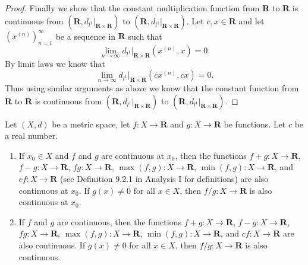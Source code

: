 \begin{proof}
    Finally we show that the constant multiplication function from \(\mathbf{R}\) to \(\mathbf{R}\) is continuous from \((\mathbf{R}, d_{l^1}|_{\mathbf{R} \times \mathbf{R}})\) to \((\mathbf{R}, d_{l^1}|_{\mathbf{R} \times \mathbf{R}})\).
    Let \(c, x \in \mathbf{R}\) and let \((x^{(n)})_{n = 1}^\infty\) be a sequence in \(\mathbf{R}\) such that
    \[
        \lim_{n \to \infty} d_{l^1}|_{\mathbf{R} \times \mathbf{R}}(x^{(n)}, x) = 0.
    \]
    By limit laws we know that
    \[
        \lim_{n \to \infty} d_{l^1}|_{\mathbf{R} \times \mathbf{R}}(cx^{(n)}, cx) = 0.
    \]
    Thus using similar arguments as above we know that the constant function from \(\mathbf{R}\) to \(\mathbf{R}\) is continuous from \((\mathbf{R}, d_{l^1}|_{\mathbf{R} \times \mathbf{R}})\) to \((\mathbf{R}, d_{l^1}|_{\mathbf{R} \times \mathbf{R}})\).
\end{proof}

\begin{corollary}\label{2.2.3}
    Let \((X, d)\) be a metric space, let \(f : X \to \mathbf{R}\) and \(g : X \to \mathbf{R}\) be functions.
    Let \(c\) be a real number.
    \begin{enumerate}
        \item If \(x_0 \in X\) and \(f\) and \(g\) are continuous at \(x_0\), then the functions \(f + g : X \to \mathbf{R}\), \(f - g : X \to \mathbf{R}\), \(fg : X \to \mathbf{R}\), \(\max(f, g) : X \to \mathbf{R}\), \(\min(f, g) : X \to \mathbf{R}\), and \(cf : X \to \mathbf{R}\) (see Definition 9.2.1 in Analysis I for definitions) are also continuous at \(x_0\).
              If \(g(x) \neq 0\) for all \(x \in X\), then \(f / g : X \to \mathbf{R}\) is also continuous at \(x_0\).
        \item If \(f\) and \(g\) are continuous, then the functions \(f + g : X \to \mathbf{R}\), \(f - g : X \to \mathbf{R}\), \(fg : X \to \mathbf{R}\), \(\max(f, g) : X \to \mathbf{R}\), \(\min(f, g) : X \to \mathbf{R}\), and \(cf : X \to \mathbf{R}\) are also continuous.
              If \(g(x) \neq 0\) for all \(x \in X\), then \(f / g : X \to \mathbf{R}\) is also continuous.
    \end{enumerate}
\end{corollary}

